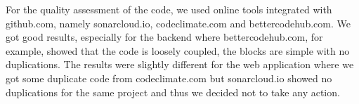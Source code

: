 For the quality assessment of the code, we used online tools integrated with github.com, namely sonarcloud.io, codeclimate.com and bettercodehub.com. We got good results, especially for the backend where bettercodehub.com, for example, showed that the code is loosely coupled, the blocks are simple with no duplications. The results were slightly different for the web application where we got some duplicate code from codeclimate.com but sonarcloud.io showed no duplications for the same project and thus we decided not to take any action.

